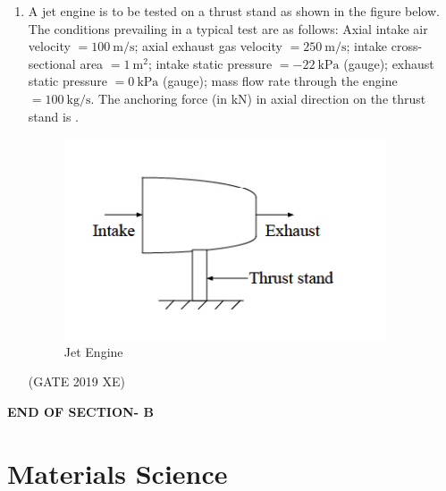 \documentclass[journal,12pt,onecolumn]{IEEEtran}
\begin{document}
\begin{enumerate}
\item A jet engine is to be tested on a thrust stand as shown in the figure below. The conditions prevailing in a typical test are as follows: Axial intake air velocity $=100\ \mathrm{m/s}$; axial exhaust gas velocity $=250\ \mathrm{m/s}$; intake cross-sectional area $=1\ \mathrm{m^2}$; intake static pressure $=-22\ \mathrm{kPa}$ (gauge); exhaust static pressure $=0\ \mathrm{kPa}$ (gauge); mass flow rate through the engine $=100\ \mathrm{kg/s}$. The anchoring force (in kN) in axial direction on the thrust stand is \underline{\hspace{2cm}}.

\begin{figure}[htbp]
  \centering
  \includegraphics[width=.75\columnwidth]{figs/B/fig5.png}
  \caption{Jet Engine}
  \label{fig:figs/B/fig5.png}
\end{figure}
\hfill{(GATE 2019 XE)}

\end{enumerate}

\begin{center}
    \item[\textbf{END OF SECTION- B}]
\end{center}




\newpage
\section*{Materials Science}
\noindent
\bigskip
\end{document}
